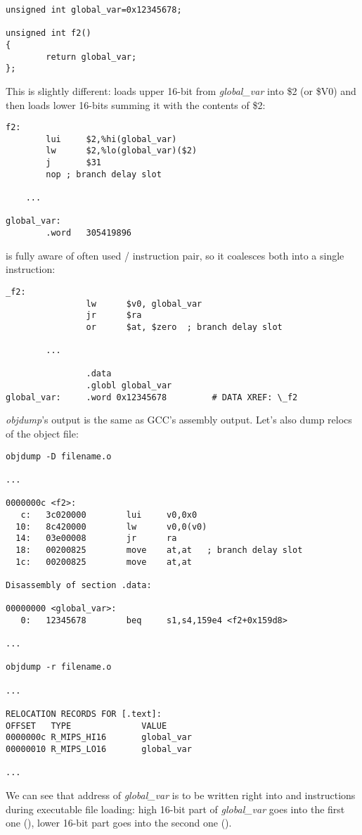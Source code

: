 \begin{lstlisting}[style=customc]
unsigned int global_var=0x12345678;

unsigned int f2()
{
        return global_var;
};
\end{lstlisting}


This is slightly different:  loads upper 16-bit from \emph{global\_var} into \$2 (or \$V0) and then  loads lower 16-bits summing it with the contents of \$2:

\begin{lstlisting}[caption=GCC 4.4.5 -O3 (\assemblyOutput),style=customasmMIPS]
f2:
        lui     $2,%hi(global_var)
        lw      $2,%lo(global_var)($2)
        j       $31
        nop	; branch delay slot

	...

global_var:
        .word   305419896
\end{lstlisting}

\IDA is fully aware of often used / instruction pair, so it coalesces both into a single  instruction:

\begin{lstlisting}[caption=GCC 4.4.5 -O3 (IDA),style=customasmMIPS]
_f2:
                lw      $v0, global_var
                jr      $ra
                or      $at, $zero	; branch delay slot

		...

                .data
                .globl global_var
global_var:     .word 0x12345678         # DATA XREF: \_f2
\end{lstlisting}

\emph{objdump}'s output is the same as GCC's assembly output.
Let's also dump relocs of the object file:

\begin{lstlisting}[caption=objdump,style=customasmMIPS]
objdump -D filename.o

...

0000000c <f2>:
   c:   3c020000        lui     v0,0x0
  10:   8c420000        lw      v0,0(v0)
  14:   03e00008        jr      ra
  18:   00200825        move    at,at	; branch delay slot
  1c:   00200825        move    at,at

Disassembly of section .data:

00000000 <global_var>:
   0:   12345678        beq     s1,s4,159e4 <f2+0x159d8>

...

objdump -r filename.o

...

RELOCATION RECORDS FOR [.text]:
OFFSET   TYPE              VALUE
0000000c R_MIPS_HI16       global_var
00000010 R_MIPS_LO16       global_var

...

\end{lstlisting}

We can see that address of \emph{global\_var} is to be written right into  and  instructions during executable file loading:
high 16-bit part of \emph{global\_var} goes into the first one (), lower 16-bit part goes into the second one ().

